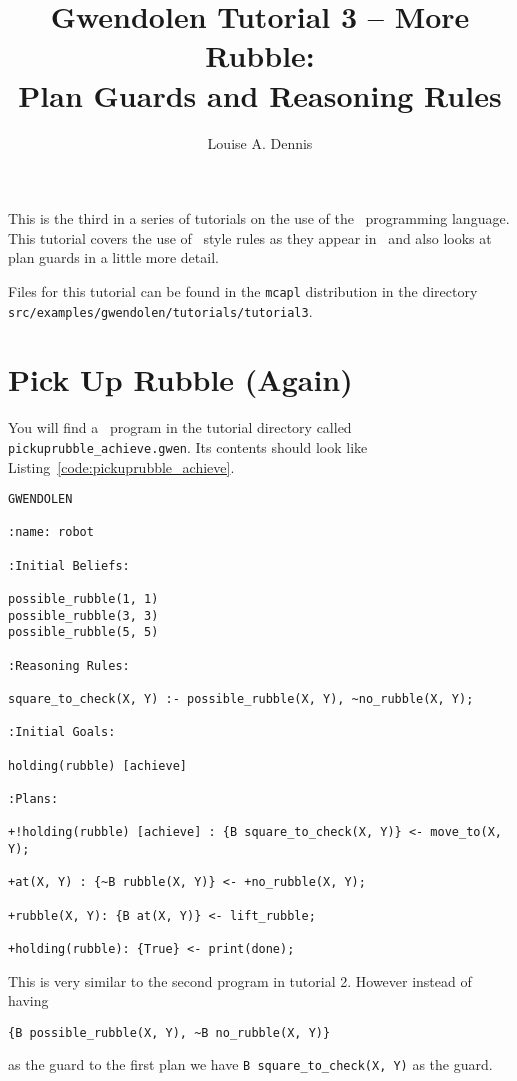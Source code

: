 \documentclass[a4]{article}
\author{Louise A. Dennis}
\title{Gwendolen Tutorial 3 -- More Rubble: \\
Plan Guards and Reasoning Rules}
\begin{document}
\maketitle
This is the third in a series of tutorials on the use of the \gwendolen\ programming language.  This tutorial covers the use of \prolog\ style rules as they appear in \gwendolen\ and also looks at plan guards in a little more detail.

Files for this tutorial can be found in the \texttt{mcapl} distribution in the directory \texttt{src/examples/gwendolen/tutorials/tutorial3}.

\section{Pick Up Rubble (Again)}

You will find a \gwendolen\ program in the tutorial directory called \texttt{pickuprubble\_achieve.gwen}.  Its contents should look like Listing~\ref{code:pickuprubble_achieve}.
\begin{lstlisting}[float,caption=Pick Up Rubble (Reasoning Rules),basicstyle=\sffamily,style=easslisting,language=Gwendolen,label=code:pickuprubble_achieve]
GWENDOLEN

:name: robot

:Initial Beliefs:

possible_rubble(1, 1)
possible_rubble(3, 3)
possible_rubble(5, 5)

:Reasoning Rules:

square_to_check(X, Y) :- possible_rubble(X, Y), ~no_rubble(X, Y);

:Initial Goals:

holding(rubble) [achieve]

:Plans:

+!holding(rubble) [achieve] : {B square_to_check(X, Y)} <- move_to(X, Y);

+at(X, Y) : {~B rubble(X, Y)} <- +no_rubble(X, Y);

+rubble(X, Y): {B at(X, Y)} <- lift_rubble;

+holding(rubble): {True} <- print(done);
\end{lstlisting}

This is very similar to the second program in tutorial 2.  However instead of having 
\begin{verbatim}
{B possible_rubble(X, Y), ~B no_rubble(X, Y)}
\end{verbatim}as the guard to the first plan we have \lstinline{B square_to_check(X, Y)} as the guard.
\end{document}
